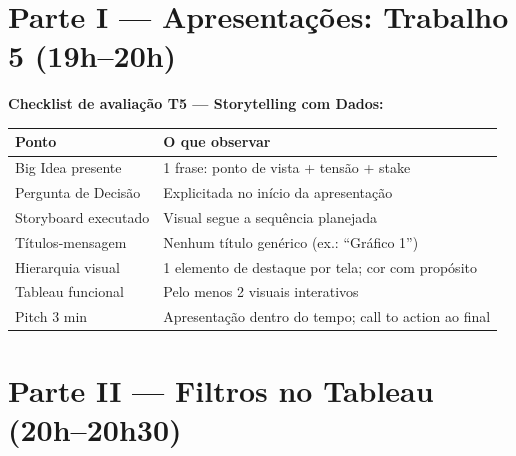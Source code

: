 \section{Parte I — Apresentações: Trabalho 5 (19h–20h)}

\begin{BoardBox}
\textbf{Checklist de avaliação T5 — Storytelling com Dados:}
\begin{tabular}{|p{4.5cm}|p{8.5cm}|}
\hline
\textbf{Ponto} & \textbf{O que observar} \\
\hline
Big Idea presente & 1 frase: ponto de vista + tensão + stake \\
Pergunta de Decisão & Explicitada no início da apresentação \\
Storyboard executado & Visual segue a sequência planejada \\
Títulos-mensagem & Nenhum título genérico (ex.: ``Gráfico 1'') \\
Hierarquia visual & 1 elemento de destaque por tela; cor com propósito \\
Tableau funcional & Pelo menos 2 visuais interativos \\
Pitch 3 min & Apresentação dentro do tempo; call to action ao final \\
\hline
\end{tabular}
\end{BoardBox}

\section{Parte II — Filtros no Tableau (20h–20h30)}

